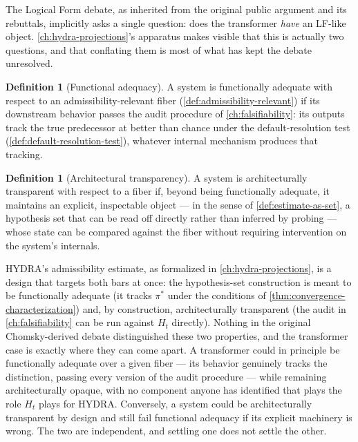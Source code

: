 \documentclass[11pt]{book}
\theoremstyle{plain}
\theoremstyle{definition}
\newtheorem{definition}[theorem]{Definition}
\theoremstyle{remark}
\begin{document}
The Logical Form debate, as inherited from the original public
argument and its rebuttals, implicitly asks a single question: does
the transformer \emph{have} an LF-like object. \cref{ch:hydra-projections}'s
apparatus makes visible that this is actually two questions, and that
conflating them is most of what has kept the debate unresolved.

\begin{definition}[Functional adequacy]
\label{def:functional-adequacy}
A system is functionally adequate with respect to an
admissibility-relevant fiber (\cref{def:admissibility-relevant}) if its
downstream behavior passes the audit procedure of \cref{ch:falsifiability}:
its outputs track the true predecessor at better than chance under the
default-resolution test (\cref{def:default-resolution-test}), whatever
internal mechanism produces that tracking.
\end{definition}

\begin{definition}[Architectural transparency]
\label{def:architectural-transparency}
A system is architecturally transparent with respect to a fiber if,
beyond being functionally adequate, it maintains an explicit,
inspectable object --- in the sense of \cref{def:estimate-as-set}, a
hypothesis set that can be read off directly rather than inferred by
probing --- whose state can be compared against the fiber without
requiring intervention on the system's internals.
\end{definition}

HYDRA's admissibility estimate, as formalized in
\cref{ch:hydra-projections}, is a design that targets both bars at
once: the hypothesis-set construction is meant to be functionally
adequate (it tracks $\pi^*$ under the conditions of
\cref{thm:convergence-characterization}) and, by construction,
architecturally transparent (the audit in \cref{ch:falsifiability} can
be run against $H_t$ directly). Nothing in the original Chomsky-derived
debate distinguished these two properties, and the transformer case is
exactly where they can come apart. A transformer could in principle be
functionally adequate over a given fiber --- its behavior genuinely
tracks the distinction, passing every version of the audit procedure
--- while remaining architecturally opaque, with no component anyone
has identified that plays the role $H_t$ plays for HYDRA. Conversely, a
system could be architecturally transparent by design and still fail
functional adequacy if its explicit machinery is wrong. The two are
independent, and settling one does not settle the other.
\end{document}
